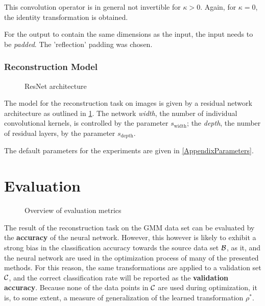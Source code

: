 This convolution operator is in general not invertible for $\kappa > 0$.
Again, for $\kappa = 0$, the identity transformation is obtained.

For the output to contain the same dimensions as the input, the input needs to be \textit{padded}.
The 'reflection' padding was chosen.


\subsubsection{Reconstruction Model}

\begin{figure}[!ht]
\begin{minipage}{0.5\textwidth}
\centering

\end{minipage}
\begin{minipage}{0.5\textwidth}
\centering

\end{minipage}
\caption{ResNet architecture}
\label{fig:resnet}
\end{figure}

The model for the reconstruction task on images is given by a residual network architecture
as outlined in \cref{fig:resnet}. 
The network \textit{width}, the number of individual convolutional kernels, is controlled by the parameter $s_\text{width}$; the \textit{depth}, the number of residual layers, by the parameter
$s_\text{depth}$.

The default parameters for the experiments are given in \cref{AppendixParameters}.




\section{Evaluation}
\label{sec:evaluation}

\begin{figure}[ht]
    \centering
    
    \caption{Overview of evaluation metrics}
    \label{fig:evaluation_overview}
    \centering
\end{figure}

The result of the reconstruction task on the GMM data set can be evaluated by the \textbf{accuracy}
of the neural network. However, this however is likely to exhibit a strong bias in the classification accuracy 
towards the source data set $\mathcal B$, as it, and 
the neural network 
are used in the optimization process
of many of the presented methods.
For this reason, the same transformations are applied to
a validation set $\mathcal C$, and the 
correct classification rate will be reported as the \textbf{validation accuracy}. 
Because none of the data points in $\mathcal C$
are used during optimization, it is, to some extent, a measure of generalization
of the learned transformation $\rho^*$.

